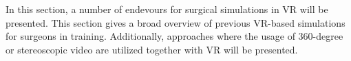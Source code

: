 In this section, a number of endevours for surgical simulations in VR will be presented.
This section gives a broad overview of previous VR-based simulations for surgeons in training.
Additionally, approaches where the usage of 360-degree or stereoscopic video are utilized together with VR will be presented.